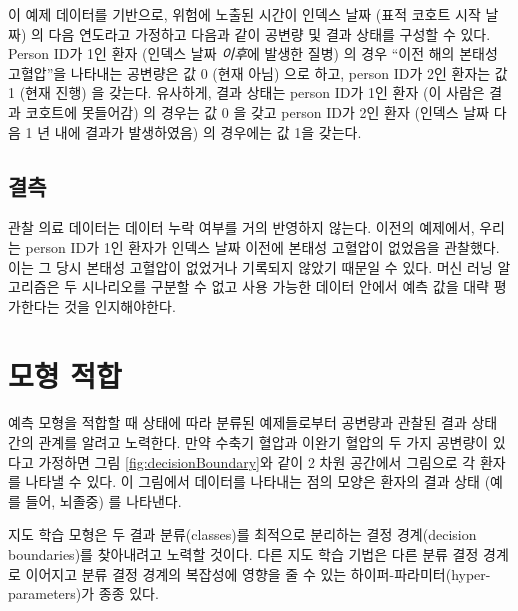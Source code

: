 \documentclass[11pt]{book}
\theoremstyle{definition}
\theoremstyle{definition}
\theoremstyle{definition}
\theoremstyle{remark}
\begin{document}
이 예제 데이터를 기반으로, 위험에 노출된 시간이 인덱스 날짜 (표적 코호트
시작 날짜) 의 다음 연도라고 가정하고 다음과 같이 공변량 및 결과 상태를
구성할 수 있다. Person ID가 1인 환자 (인덱스 날짜 \emph{이후}에 발생한
질병) 의 경우 ``이전 해의 본태성 고혈압''을 나타내는 공변량은 값 0 (현재
아님) 으로 하고, person ID가 2인 환자는 값 1 (현재 진행) 을 갖는다.
유사하게, 결과 상태는 person ID가 1인 환자 (이 사람은 결과 코호트에
못들어감) 의 경우는 값 0 을 갖고 person ID가 2인 환자 (인덱스 날짜 다음
1 년 내에 결과가 발생하였음) 의 경우에는 값 1을 갖는다.

\subsection{결측}

관찰 의료 데이터는 데이터 누락 여부를 거의 반영하지 않는다. 이전의
예제에서, 우리는 person ID가 1인 환자가 인덱스 날짜 이전에 본태성
고혈압이 없었음을 관찰했다. 이는 그 당시 본태성 고혈압이 없었거나
기록되지 않았기 때문일 수 있다. 머신 러닝 알고리즘은 두 시나리오를
구분할 수 없고 사용 가능한 데이터 안에서 예측 값을 대략 평가한다는 것을
인지해야한다. 

\section{모형 적합}\label{modelFitting}

예측 모형을 적합할 때 상태에 따라 분류된 예제들로부터 공변량과 관찰된
결과 상태 간의 관계를 알려고 노력한다. 만약 수축기 혈압과 이완기 혈압의
두 가지 공변량이 있다고 가정하면 그림 \ref{fig:decisionBoundary}와 같이
2 차원 공간에서 그림으로 각 환자를 나타낼 수 있다. 이 그림에서 데이터를
나타내는 점의 모양은 환자의 결과 상태 (예를 들어, 뇌졸중) 를 나타낸다.

지도 학습 모형은 두 결과 분류(classes)를 최적으로 분리하는 결정
경계(decision boundaries)를 찾아내려고 노력할 것이다. 다른 지도 학습
기법은 다른 분류 결정 경계로 이어지고 분류 결정 경계의 복잡성에 영향을
줄 수 있는 하이퍼-파라미터(hyper-parameters)가 종종
있다.
\end{document}
